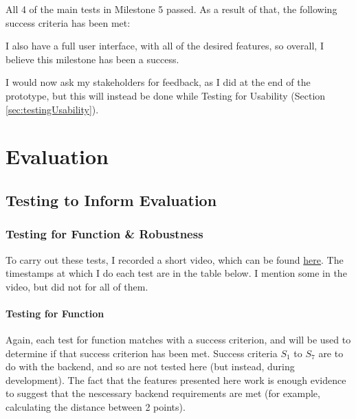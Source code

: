 \documentclass[12pt]{report}
\begin{document}
All 4 of the main tests in Milestone 5 passed. As a result of that, the following success criteria has been met:

\begin{center}
\end{center}

I also have a full user interface, with all of the desired features, so overall, I believe this milestone has been a success.

I would now ask my stakeholders for feedback, as I did at the end of the  prototype, but this will instead be done while Testing for Usability (Section \ref{sec:testingUsability}).

\chapter{Evaluation}
\section{Testing to Inform Evaluation}
\subsection{Testing for Function \& Robustness}
To carry out these tests, I recorded a short video, which can be found \href{https://www.youtube.com/watch?v=2h3wpsdf_6g}{here}. The timestamps at which I do each test are in the table below. I mention some in the video, but did not for all of them. 

\subsubsection{Testing for Function}
Again, each test for function matches with a success criterion, and will be used to determine if that success criterion has been met. Success criteria $S_{1}$ to $S_{7}$ are to do with the backend, and so are not tested here (but instead, during development). The fact that the features presented here work is enough evidence to suggest that the nescessary backend requirements are met (for example, calculating the distance between 2 points).
\end{document}
